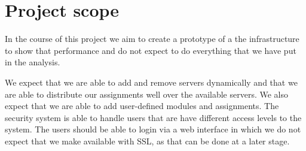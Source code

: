 \chapter{Project scope}
In the course of this project we aim to create a prototype of a the
infrastructure to show that performance and do not expect to do everything that
we have put in the analysis.

We expect that we are able to add and remove servers dynamically and that we
are able to distribute our assignments well over the available servers. We also
expect that we are able to add user-defined modules and assignments.
The security system is able to handle users that are have different access
levels to the system. The users should be able to login via a web interface in
which we do not expect that we make available with SSL, as that can be done at a
later stage.
